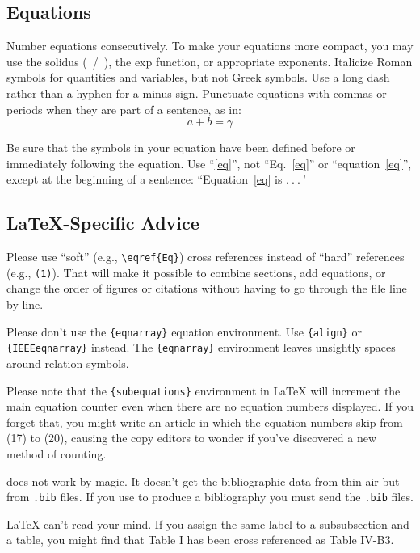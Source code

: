 \subsection{Equations}
Number equations consecutively. To make your
equations more compact, you may use the solidus (~/~), the exp function, or
appropriate exponents. Italicize Roman symbols for quantities and variables,
but not Greek symbols. Use a long dash rather than a hyphen for a minus
sign. Punctuate equations with commas or periods when they are part of a
sentence, as in:
\begin{equation}
	a+b=\gamma\label{eq}
\end{equation}

Be sure that the
symbols in your equation have been defined before or immediately following
the equation. Use ``\eqref{eq}'', not ``Eq.~\eqref{eq}'' or ``equation\ \eqref{eq}'', except at
the beginning of a sentence: ``Equation\ \eqref{eq} is $.\ .\ .\ $'

\subsection{\LaTeX-Specific Advice}

Please use ``soft'' (e.g., \verb|\eqref{Eq}|) cross references instead
of ``hard'' references (e.g., \verb|(1)|). That will make it possible
to combine sections, add equations, or change the order of figures or
citations without having to go through the file line by line.

Please don't use the \verb|{eqnarray}| equation environment. Use
\verb|{align}| or \verb|{IEEEeqnarray}| instead. The \verb|{eqnarray}|
environment leaves unsightly spaces around relation symbols.

Please note that the \verb|{subequations}| environment in {\LaTeX}
will increment the main equation counter even when there are no
equation numbers displayed. If you forget that, you might write an
article in which the equation numbers skip from (17) to (20), causing
the copy editors to wonder if you've discovered a new method of
counting.

	{\BibTeX} does not work by magic. It doesn't get the bibliographic
data from thin air but from \texttt{.bib} files. If you use {\BibTeX} to produce a
bibliography you must send the \texttt{.bib} files.

	{\LaTeX} can't read your mind. If you assign the same label to a
subsubsection and a table, you might find that Table I has been cross
referenced as Table IV-B3.

